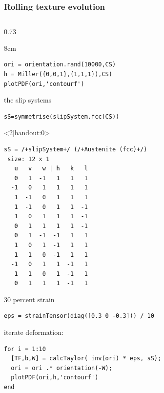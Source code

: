 \documentclass[compress,aspectratio=1610,fleqn]{beamer}
\begin{document}
\begin{frame}[fragile]
  \frametitle{Rolling texture evolution}

  \begin{columns}
    \begin{column}{0.73\textwidth}

      \vspace{-0.7cm}
      \begin{overlayarea}{\textwidth}{8cm}

\begin{lstlisting}[style=input]
ori = orientation.rand(10000,CS)
h = Miller({0,0,1},{1,1,1}),CS)
plotPDF(ori,'contourf')
\end{lstlisting}

\pause

the slip systems
\vspace{-0.2cm}
        \begin{lstlisting}[style=input]
sS=symmetrise(slipSystem.fcc(CS))
      \end{lstlisting}

      \begin{onlyenv}<2|handout:0>
        \vspace{-0.2cm}
      \begin{lstlisting}[style=output]
sS = /+slipSystem+/ (/+Austenite (fcc)+/)
 size: 12 x 1
   u   v   w | h   k   l
   0   1  -1   1   1   1
  -1   0   1   1   1   1
   1  -1   0   1   1   1
   1  -1   0   1   1  -1
   1   0   1   1   1  -1
   0   1   1   1   1  -1
   0   1  -1  -1   1   1
   1   0   1  -1   1   1
   1   1   0  -1   1   1
  -1   0   1   1  -1   1
   1   1   0   1  -1   1
   0   1   1   1  -1   1
      \end{lstlisting}
    \end{onlyenv}

    \pause

30 percent strain
\vspace{-0.2cm}
\begin{lstlisting}[style=input]
eps = strainTensor(diag([0.3 0 -0.3])) / 10
\end{lstlisting}

\pause

iterate deformation:
\vspace{-0.2cm}
      \begin{lstlisting}[style=input]
for i = 1:10
  [TF,b,W] = calcTaylor( inv(ori) * eps, sS);
  ori = ori .* orientation(-W);
  plotPDF(ori,h,'contourf')
end
\end{lstlisting}


\end{overlayarea}
\end{column}
\end{columns}
\end{frame}
\end{document}

